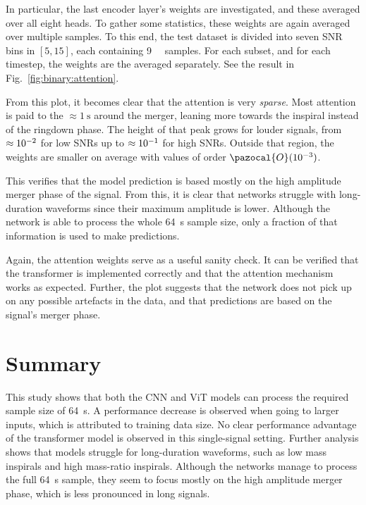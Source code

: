 In particular, the last encoder layer's weights are investigated, and these averaged over all eight heads.
To gather some statistics, these weights are again averaged over multiple samples. To this end, the test dataset is divided into seven SNR bins in $[5, 15]$, each containing \SI{9}{\kilo\nothing} samples. For each subset, and for each timestep, the weights are the averaged separately. See the result in Fig.~\ref{fig:binary:attention}.


From this plot, it becomes clear that the attention is very \emph{sparse}. Most attention is paid to the $\approx\SI{1}{\second}$ around the merger, leaning more towards the inspiral instead of the ringdown phase. The height of that peak grows for louder signals, from $\approx\SI{E-2}{}$ for low SNRs up to  $\approx\SI{E-1}{}$ for high SNRs. Outside that region, the weights are smaller on average with values of order $\pazocal{O}(\SI{E-3}{})$. 


This verifies that the model prediction is based mostly on the high amplitude merger phase of the signal. From this, it is clear that networks struggle with long-duration waveforms since their maximum amplitude is lower. Although the network is able to process the whole \SI{64}{\second} sample size, only a fraction of that information is used to make predictions. 

Again, the attention weights serve as a useful sanity check. It can be verified that the transformer is implemented correctly and that the attention mechanism works as expected. Further, the plot suggests that the network does not pick up on any possible artefacts in the data, and that predictions are based on the signal's merger phase.

\section{Summary}

This study shows that both the CNN and ViT models can process the required sample size of \SI{64}{\second}. A performance decrease is observed when going to larger inputs, which is attributed to training data size. No clear performance advantage of the transformer model is observed in this single-signal setting. Further analysis shows that models struggle for long-duration waveforms, such as low mass inspirals and high mass-ratio inspirals. Although the networks manage to process the full \SI{64}{\second} sample, they seem to focus mostly on the high amplitude merger phase, which is less pronounced in long signals.

